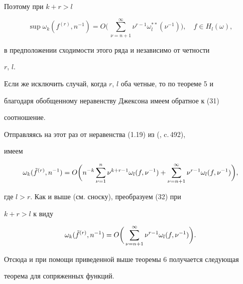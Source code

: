 \begin{pf}
Поэтому при $k+r>l$


\begin{equation}


\sup\omega_k(f^{(r)},n^{-1})=O\biggl(\,


\sum^\infty_{\nu=n+1}\nu^{r-1}\omega^{**}_l(\nu^{-1})\biggr),\quad


f\in H_l(\omega),


\end{equation}


в предположении сходимости этого ряда и независимо от четности


$r$, $l$.





Если же исключить случай, когда $r$, $l$ оба четные, то по теореме 5 и


благодаря обобщенному неравенству Джексона имеем обратное к (31)


соотношение.


\end{pf}





Отправляясь на этот раз от неравенства (1.19) из (\cite{Bar}, c.\,492),


имеем


\begin{equation}


\omega_k(\Tilde f^{(r)},n^{-1})=O\biggl(n^{-k}\sum^n_{\nu=1}


\nu^{k+r-1}\omega_l(f,\nu^{-1})+\sum^\infty_{\nu=n+1}


\nu^{r-1}\omega_l(f,\nu^{-1})\biggr),


\end{equation}


где $l>r$. Как и выше (см. сноску), преобразуем (32) при


$k+r>l$ к виду


\begin{equation}


\omega_k(\Tilde f^{(r)},n^{-1})=O\biggl(\,\sum^\infty_{\nu=n+1}


\nu^{r-1}\omega_l(f,\nu^{-1})\biggr).


\end{equation}


Отсюда и при помощи приведенной выше теоремы 6 получается следующая


теорема для сопряженных функций.





